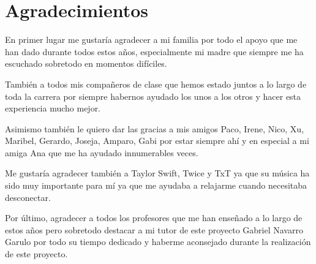 

\chapter*{Agradecimientos}

En primer lugar me gustaría agradecer a mi familia por todo el apoyo que me han dado durante todos estos años, especialmente mi madre que siempre me ha escuchado sobretodo en momentos difíciles.

También a todos mis compañeros de clase que hemos estado juntos a lo largo de toda la carrera por siempre habernos ayudado los unos a los otros y hacer esta experiencia mucho mejor.

Asimismo también le quiero dar las gracias a mis amigos Paco, Irene, Nico, Xu, Maribel, Gerardo, Joseja, Amparo, Gabi por estar siempre ahí y en especial a mi amiga Ana que me ha ayudado innumerables veces. 

Me gustaría agradecer también a Taylor Swift, Twice y TxT ya que su música ha sido muy importante para mí ya que me ayudaba a relajarme cuando necesitaba desconectar.

Por último, agradecer a todos los profesores que me han enseñado a lo largo de estos años pero sobretodo destacar a mi tutor de este proyecto Gabriel Navarro Garulo por todo su tiempo dedicado y haberme aconsejado durante la realización de este proyecto.